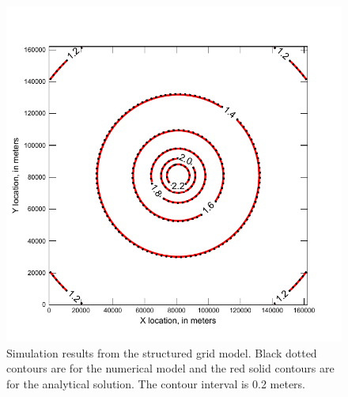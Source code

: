 \documentclass[fleqn]{article}
\begin{document}
\begin{figure}[h!tbp]
	\centering
	\includegraphics[scale=0.9]{figures/oned-structured-results.pdf}
	\caption[Simulation results from the structured grid model.]{Simulation results from the structured grid model.  Black dotted contours are for the numerical model and the red solid contours are for the analytical solution.  The contour interval is 0.2 meters.}
	\label{fig:oned-structured-results}
\end{figure}
\end{document}
